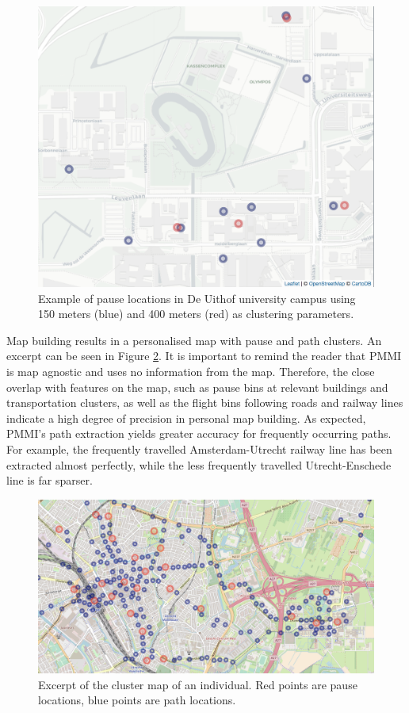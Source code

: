 \documentclass[man]{apa6}
\theoremstyle{definition}
\theoremstyle{definition}
\theoremstyle{definition}
\theoremstyle{remark}
\begin{document}
\begin{figure}
\includegraphics[width=1\linewidth]{img/distanceParam} \caption{Example of pause locations in De Uithof university campus using 150 meters (blue) and 400 meters (red) as clustering parameters.}\label{fig:pauseLocUithof1}
\end{figure}

Map building results in a personalised map with pause and path clusters.
An excerpt can be seen in Figure \ref{fig:mapClusterMap}. It is
important to remind the reader that PMMI is map agnostic and uses no
information from the map. Therefore, the close overlap with features on
the map, such as pause bins at relevant buildings and transportation
clusters, as well as the flight bins following roads and railway lines
indicate a high degree of precision in personal map building. As
expected, PMMI's path extraction yields greater accuracy for frequently
occurring paths. For example, the frequently travelled Amsterdam-Utrecht
railway line has been extracted almost perfectly, while the less
frequently travelled Utrecht-Enschede line is far sparser.

\begin{figure}
\includegraphics[width=1\linewidth]{img/mapClusterMap} \caption{Excerpt of the cluster map of an individual. Red points are pause locations, blue points are path locations.}\label{fig:mapClusterMap}
\end{figure}
\end{document}
